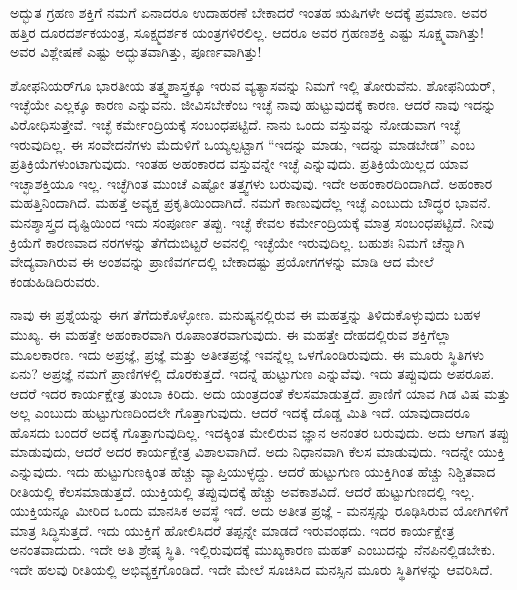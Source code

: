 ಅದ್ಭುತ ಗ್ರಹಣ ಶಕ್ತಿಗೆ ನಮಗೆ ಏನಾದರೂ ಉದಾಹರಣೆ ಬೇಕಾದರೆ ಇಂತಹ ಋಷಿಗಳೇ ಅದಕ್ಕೆ ಪ್ರಮಾಣ. ಅವರ ಹತ್ತಿರ ದೂರದರ್ಶಕಯಂತ್ರ, ಸೂಕ್ಷ್ಮದರ್ಶಕ ಯಂತ್ರಗಳಿರಲಿಲ್ಲ. ಆದರೂ ಅವರ ಗ್ರಹಣಶಕ್ತಿ ಎಷ್ಟು ಸೂಕ್ಷ್ಮವಾಗಿತ್ತು! ಅವರ ವಿಶ್ಲೇಷಣೆ ಎಷ್ಟು ಅದ್ಭುತವಾಗಿತ್ತು, ಪೂರ್ಣವಾಗಿತ್ತು!

ಶೋಫನಿಯರ್‌ಗೂ ಭಾರತೀಯ ತತ್ತ್ವಶಾಸ್ತ್ರಕ್ಕೂ ಇರುವ ವ್ಯತ್ಯಾಸವನ್ನು ನಿಮಗೆ ಇಲ್ಲಿ ತೋರುವೆನು. ಶೋಫನಿಯರ್, ಇಚ್ಛೆಯೇ ಎಲ್ಲಕ್ಕೂ ಕಾರಣ ಎನ್ನುವನು. ಜೀವಿಸಬೇಕೆಂಬ ಇಚ್ಛೆ ನಾವು ಹುಟ್ಟುವುದಕ್ಕೆ ಕಾರಣ. ಆದರೆ ನಾವು ಇದನ್ನು ವಿರೋಧಿಸುತ್ತೇವೆ. ಇಚ್ಛೆ ಕರ್ಮೇಂದ್ರಿಯಕ್ಕೆ ಸಂಬಂಧಪಟ್ಟಿದೆ. ನಾನು ಒಂದು ವಸ್ತುವನ್ನು ನೋಡುವಾಗ ಇಚ್ಛೆ ಇರುವುದಿಲ್ಲ. ಈ ಸಂವೇದನೆಗಳು ಮೆದುಳಿಗೆ ಒಯ್ಯಲ್ಪಟ್ಟಾಗ “ಇದನ್ನು ಮಾಡು, ಇದನ್ನು ಮಾಡಬೇಡ” ಎಂಬ ಪ್ರತಿಕ್ರಿಯೆಗಳುಂಟಾಗುವುದು. ಇಂತಹ ಅಹಂಕಾರದ ವಸ್ತುವನ್ನೇ ಇಚ್ಛೆ ಎನ್ನುವುದು. ಪ್ರತಿಕ್ರಿಯೆಯಿಲ್ಲದ ಯಾವ ಇಚ್ಛಾಶಕ್ತಿಯೂ ಇಲ್ಲ. ಇಚ್ಛೆಗಿಂತ ಮುಂಚೆ ಎಷ್ಟೋ ತತ್ತ್ವಗಳು ಬರುವುವು. ಇದೇ ಅಹಂಕಾರದಿಂದಾಗಿದೆ. ಅಹಂಕಾರ ಮಹತ್ತಿನಿಂದಾಗಿದೆ. ಮಹತ್ತೆ ಅವ್ಯಕ್ತ ಪ್ರಕೃತಿಯಿಂದಾಗಿದೆ. ನಮಗೆ ಕಾಣುವುದೆಲ್ಲ ಇಚ್ಛೆ ಎಂಬುದು ಬೌದ್ಧರ ಭಾವನೆ. ಮನಶ್ಶಾಸ್ತ್ರದ ದೃಷ್ಟಿಯಿಂದ ಇದು ಸಂಪೂರ್ಣ ತಪ್ಪು. ಇಚ್ಛೆ ಕೇವಲ ಕರ್ಮೇಂದ್ರಿಯಕ್ಕೆ ಮಾತ್ರ ಸಂಬಂಧಪಟ್ಟಿದೆ. ನೀವು ಕ್ರಿಯೆಗೆ ಕಾರಣವಾದ ನರಗಳನ್ನು ತೆಗೆದುಬಿಟ್ಟರೆ ಅವನಲ್ಲಿ ಇಚ್ಛೆಯೇ ಇರುವುದಿಲ್ಲ. ಬಹುಶಃ ನಿಮಗೆ ಚೆನ್ನಾಗಿ ವೇದ್ಯವಾಗಿರುವ ಈ ಅಂಶವನ್ನು ಪ್ರಾಣಿವರ್ಗದಲ್ಲಿ ಬೇಕಾದಷ್ಟು ಪ್ರಯೋಗಗಳನ್ನು ಮಾಡಿ ಆದ ಮೇಲೆ ಕಂಡುಹಿಡಿದಿರುವರು.

ನಾವು ಈ ಪ್ರಶ್ನೆಯನ್ನು ಈಗ ತೆಗೆದುಕೊಳ್ಳೋಣ. ಮನುಷ್ಯನಲ್ಲಿರುವ ಈ ಮಹತ್ತನ್ನು ತಿಳಿದುಕೊಳ್ಳುವುದು ಬಹಳ ಮುಖ್ಯ. ಈ ಮಹತ್ತೇ ಅಹಂಕಾರವಾಗಿ ರೂಪಾಂತರವಾಗುವುದು. ಈ ಮಹತ್ತೇ ದೇಹದಲ್ಲಿರುವ ಶಕ್ತಿಗೆಲ್ಲಾ ಮೂಲಕಾರಣ. ಇದು ಅಪ್ರಜ್ಞೆ, ಪ್ರಜ್ಞೆ ಮತ್ತು ಅತೀತಪ್ರಜ್ಞೆ ಇವನ್ನೆಲ್ಲ ಒಳಗೊಂಡಿರುವುದು. ಈ ಮೂರು ಸ್ಥಿತಿಗಳು ಏನು? ಅಪ್ರಜ್ಞೆ ನಮಗೆ ಪ್ರಾಣಿಗಳಲ್ಲಿ ದೊರಕುತ್ತದೆ. ಇದನ್ನೆ ಹುಟ್ಟುಗುಣ ಎನ್ನುವೆವು. ಇದು ತಪ್ಪುವುದು ಅಪರೂಪ. ಆದರೆ ಇದರ ಕಾರ್ಯಕ್ಷೇತ್ರ ತುಂಬಾ ಕಿರಿದು. ಅದು ಯಂತ್ರದಂತೆ ಕೆಲಸಮಾಡುತ್ತದೆ. ಪ್ರಾಣಿಗೆ ಯಾವ ಗಿಡ ವಿಷ ಮತ್ತು ಅಲ್ಲ ಎಂಬುದು ಹುಟ್ಟುಗುಣದಿಂದಲೇ ಗೊತ್ತಾಗುವುದು. ಆದರೆ ಇದಕ್ಕೆ ದೊಡ್ಡ ಮಿತಿ ಇದೆ. ಯಾವುದಾದರೂ ಹೊಸದು ಬಂದರೆ ಅದಕ್ಕೆ ಗೊತ್ತಾಗುವುದಿಲ್ಲ. ಇದಕ್ಕಿಂತ ಮೇಲಿರುವ ಜ್ಞಾನ ಅನಂತರ ಬರುವುದು. ಅದು ಆಗಾಗ ತಪ್ಪು ಮಾಡುವುದು, ಆದರೆ ಅದರ ಕಾರ್ಯಕ್ಷೇತ್ರ ವಿಶಾಲವಾಗಿದೆ. ಅದು ನಿಧಾನವಾಗಿ ಕೆಲಸ ಮಾಡುವುದು. ಇದನ್ನೇ ಯುಕ್ತಿ ಎನ್ನುವುದು. ಇದು ಹುಟ್ಟುಗುಣಕ್ಕಿಂತ ಹೆಚ್ಚು ವ್ಯಾಪ್ತಿಯುಳ್ಳದ್ದು. ಆದರೆ ಹುಟ್ಟುಗುಣ ಯುಕ್ತಿಗಿಂತ ಹೆಚ್ಚು ನಿಶ್ಚಿತವಾದ ರೀತಿಯಲ್ಲಿ ಕೆಲಸಮಾಡುತ್ತದೆ. ಯುಕ್ತಿಯಲ್ಲಿ ತಪ್ಪುವುದಕ್ಕೆ ಹೆಚ್ಚು ಅವಕಾಶವಿದೆ. ಆದರೆ ಹುಟ್ಟುಗುಣದಲ್ಲಿ ಇಲ್ಲ. ಯುಕ್ತಿಯನ್ನೂ ಮೀರಿದ ಒಂದು ಮಾನಸಿಕ ಅವಸ್ಥೆ ಇದೆ. ಅದು ಅತೀತ ಪ್ರಜ್ಞೆ - ಮನಸ್ಸನ್ನು ರೂಢಿಸಿರುವ ಯೋಗಿಗಳಿಗೆ ಮಾತ್ರ ಸಿದ್ಧಿಸುತ್ತದೆ. ಇದು ಯುಕ್ತಿಗೆ ಹೋಲಿಸಿದರೆ ತಪ್ಪನ್ನೇ ಮಾಡದೆ ಇರುವಂಥದು. ಇದರ ಕಾರ್ಯಕ್ಷೇತ್ರ ಅನಂತವಾದುದು. ಇದೇ ಅತಿ ಶ್ರೇಷ್ಠ ಸ್ಥಿತಿ. ಇಲ್ಲಿರುವುದಕ್ಕೆ ಮುಖ್ಯಕಾರಣ ಮಹತ್ ಎಂಬುದನ್ನು ನೆನಪಿನಲ್ಲಿಡಬೇಕು. ಇದೇ ಹಲವು ರೀತಿಯಲ್ಲಿ ಅಭಿವ್ಯಕ್ತಗೊಂಡಿದೆ. ಇದೇ ಮೇಲೆ ಸೂಚಿಸಿದ ಮನಸ್ಸಿನ ಮೂರು ಸ್ಥಿತಿಗಳನ್ನು ಆವರಿಸಿದೆ.

